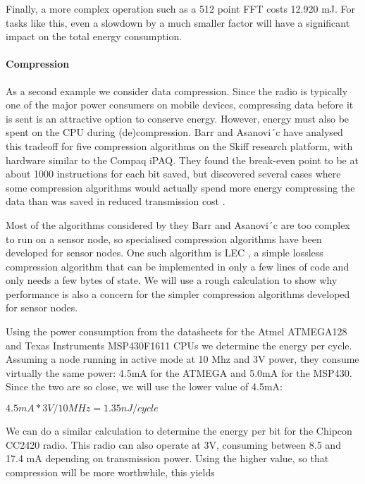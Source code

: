 Finally, a more complex operation such as a 512 point FFT costs 12.920 mJ. For tasks like this, even a slowdown by a much smaller factor will have a significant impact on the total energy consumption.

\paragraph{Compression}
As a second example we consider data compression. Since the radio is typically one of the major power consumers on mobile devices, compressing data before it is sent is an attractive option to conserve energy. However, energy must also be spent on the CPU during (de)compression. Barr and Asanovi\ ́c have analysed this tradeoff for five compression algorithms on the Skiff research platform, with hardware similar to the Compaq iPAQ. They found the break-even point to be at about 1000 instructions for each bit saved, but discovered several cases where some compression algorithms would actually spend more energy compressing the data than was saved in reduced transmission cost \cite{Barr:2006vg}.

Most of the algorithms considered by they Barr and Asanovi\ ́c are too complex to run on a sensor node, so specialised compression algorithms have been developed for sensor nodes. One such algorithm is LEC \cite{Marcelloni:2009ja}, a simple lossless compression algorithm that can be implemented in only a few lines of code and only needs a few bytes of state. We will use a rough calculation to show why performance is also a concern for the simpler compression algorithms developed for sensor nodes.

Using the power consumption from the datasheets for the Atmel ATMEGA128 and Texas Instruments MSP430F1611 CPUs \cite{Atmel:ATMEGA128Datasheet, TexasInstrumentsIncorporated:MSP430F1611Datasheet} we determine the energy per cycle. Assuming a node running in active mode at 10 Mhz and 3V power, they consume virtually the same power: 4.5mA for the ATMEGA and 5.0mA for the MSP430. Since the two are so close, we will use the lower value of 4.5mA:

$4.5mA * 3V / 10MHz = 1.35nJ / cycle$

We can do a similar calculation to determine the energy per bit for the Chipcon CC2420 radio.  This radio can also operate at 3V, consuming between 8.5 and 17.4 mA depending on transmission power. Using the higher value, so that compression will be more worthwhile, this yields

